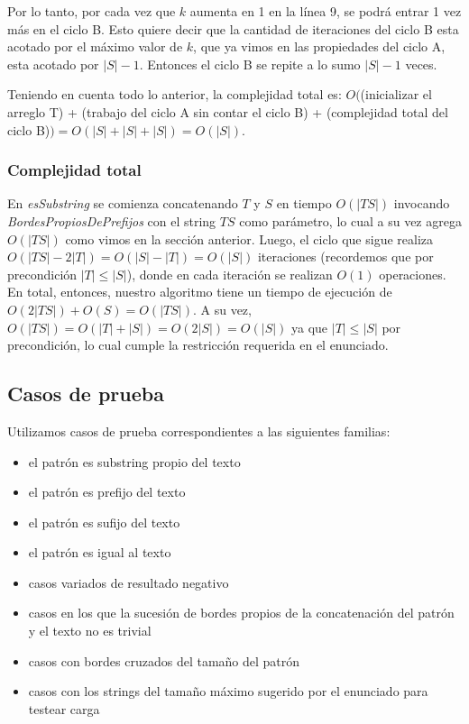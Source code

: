 Por lo tanto, por cada vez que $k$ aumenta en 1 en la línea 9, se podrá entrar 1 vez más en el ciclo B. Esto
quiere decir que la cantidad de iteraciones del ciclo B esta acotado por el máximo valor de $k$, que ya
vimos en las propiedades del ciclo A, esta acotado por $|S|-1$. Entonces el ciclo B se repite a lo sumo $|S|-1$
veces.

Teniendo en cuenta todo lo anterior, la complejidad total es:
$O($(inicializar el arreglo T) + (trabajo del ciclo A sin contar el ciclo B) + (complejidad total del ciclo B)$)
= O(|S| + |S| + |S|) = O(|S|)$.

\subsubsection{Complejidad total}

En \textit{esSubstring} se comienza concatenando $T$ y $S$ en tiempo $O(|TS|)$ invocando \textit{BordesPropiosDePrefijos} con el string $TS$ como parámetro, lo cual a su vez agrega $O(|TS|)$ como vimos en la sección anterior. Luego, el ciclo que sigue realiza $O(|TS|-2|T|) = O(|S|-|T|) = O(|S|)$ iteraciones (recordemos que por precondición $|T| \leq |S|$), donde en cada iteración se realizan $O(1)$ operaciones. En total, entonces, nuestro algoritmo tiene un tiempo de ejecución de $O(2|TS|) + O(S) = O(|TS|)$. A su vez, $O(|TS|) = O(|T|+|S|) = O(2|S|) = O(|S|)$ ya que $|T| \leq |S|$ por precondición, lo cual cumple la restricción requerida en el enunciado.

\subsection{Casos de prueba}

Utilizamos casos de prueba correspondientes a las siguientes familias:
\begin{itemize}
\item el patrón es substring propio del texto
\item el patrón es prefijo del texto
\item el patrón es sufijo del texto
\item el patrón es igual al texto
\item casos variados de resultado negativo
\item casos en los que la sucesión de bordes propios de la concatenación del patrón y el texto no es trivial
\item casos con bordes cruzados del tamaño del patrón
\item casos con los strings del tamaño máximo sugerido por el enunciado para testear carga
\end{itemize}


